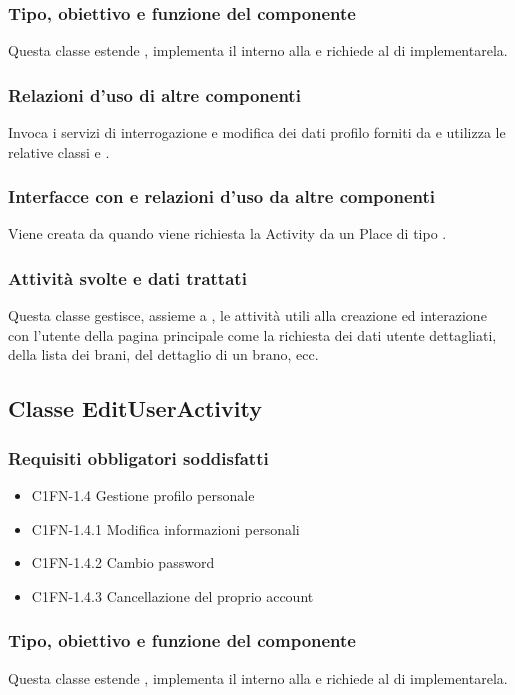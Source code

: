 \subsubsection*{Tipo, obiettivo e funzione del componente}
Questa classe estende , implementa il 
interno alla  e richiede al  di
implementarela.
\subsubsection*{Relazioni d'uso di altre componenti}
Invoca i servizi di interrogazione e modifica dei dati profilo forniti da
 e utilizza le relative classi  e
.
\subsubsection*{Interfacce con e relazioni d'uso da altre componenti}
Viene creata da  quando viene richiesta la Activity da
un Place di tipo .
\subsubsection*{Attivit\`a svolte e dati trattati}
Questa classe gestisce, assieme a , le attivit\`a utili alla
creazione ed interazione con l'utente della pagina principale come la
richiesta dei dati utente dettagliati, della lista dei brani, del dettaglio di
un brano, ecc.


\subsection{Classe EditUserActivity}
\subsubsection*{Requisiti obbligatori soddisfatti}
\begin{itemize}
	\item C1FN-1.4 Gestione profilo personale
	\item C1FN-1.4.1 Modifica informazioni personali
	\item C1FN-1.4.2 Cambio password
	\item C1FN-1.4.3 Cancellazione del proprio account
\end{itemize}
\subsubsection*{Tipo, obiettivo e funzione del componente}
Questa classe estende , implementa il 
interno alla  e richiede al  di
implementarela.

